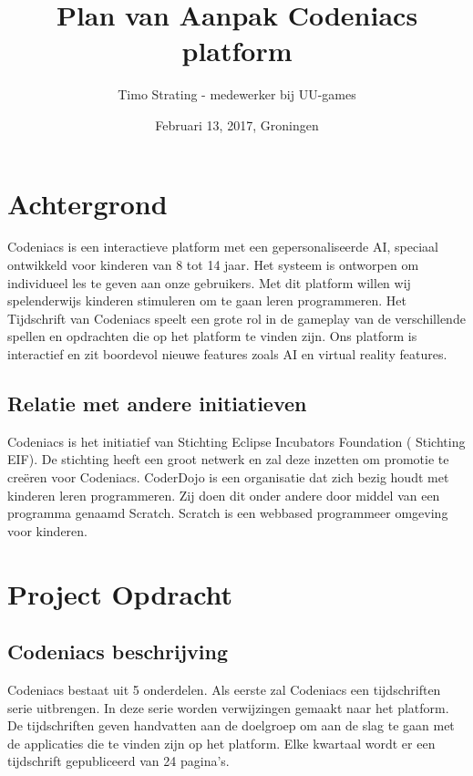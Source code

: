\documentclass[]{report}
\title{Plan van Aanpak Codeniacs platform}
\author{Timo Strating - medewerker bij UU-games}
\date{Februari 13, 2017, Groningen}
\begin{document}
\maketitle

\tableofcontents
\newpage






\chapter{Achtergrond}

Codeniacs is een interactieve platform met een gepersonaliseerde AI, speciaal ontwikkeld voor kinderen van 8 tot 14 jaar. Het systeem is ontworpen om individueel les te geven aan onze gebruikers. Met dit platform willen wij spelenderwijs kinderen stimuleren om te gaan leren programmeren. Het Tijdschrift van Codeniacs speelt een grote rol in de gameplay van de verschillende spellen en opdrachten die op het platform te vinden zijn. Ons platform is interactief en zit boordevol nieuwe features zoals AI en virtual reality features.

\section{Relatie met andere initiatieven}
Codeniacs is het initiatief van Stichting Eclipse Incubators Foundation ( Stichting EIF). De stichting heeft een groot netwerk en zal deze inzetten om promotie te cre\"{e}ren voor Codeniacs. CoderDojo is een organisatie dat zich bezig houdt met kinderen leren programmeren. Zij doen dit onder andere door middel van een programma genaamd Scratch. Scratch is een webbased programmeer omgeving voor kinderen.




\chapter{Project Opdracht}

\section{Codeniacs beschrijving}
Codeniacs bestaat uit 5 onderdelen. Als eerste zal Codeniacs een tijdschriften serie uitbrengen. In deze serie worden verwijzingen gemaakt naar het platform. De tijdschriften geven handvatten aan de doelgroep om aan de slag te gaan met de applicaties die te vinden zijn op het platform. Elke kwartaal wordt er een tijdschrift gepubliceerd van 24 pagina's.
\end{document}
